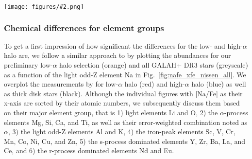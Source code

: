 \documentclass[fleqn,usenatbib]{mnras}
\newcommand{\codeicon}{{\faCloudDownload}}
\newcommand{\codelink}[1]{\href{https://github.com/svenbuder/Accreted-stars-in-GALAH-DR3/tree/main/figures/#1.ipynb}{\codeicon}\,\,}
\newcommand{\oscaption}[2]{\caption{#2 \codelink{#1}}}
\newcommand{\figuretextwidth}[4]{\begin{figure*} \centering \texttt{[image: figures/\#2.png]}\oscaption{#3}{#4}\label{fig:#2} \end{figure*}}
\begin{document}
\figuretextwidth{17cm}{nafe_xfe_nissen_all}{chemical_differences}{
\textbf{Abundances [X/Fe] for the the 28 elements measured by GALAH in addition to Na and Fe, whose abundance ratio [Na/Fe] is used on the ordinate.} The density distribution of the base sample of GALAH+ DR3 (Eq.~\ref{eq:basic_cuts}) is shown in greyscale. GALAH+ DR3 stars which are preliminary tagged to the low-$\alpha$ halo (via Eq.~\ref{eq:prelim_low_alpha_halo}) are shown in orange with numbers indicate in the bottom right.
We also show the data by \citet{Nissen2010} for $\alpha$, Na, Mg, Si, Ca, Ti, Cr, and Ni with red circles for their low-$\alpha$ halo stars, blue open circles for their high-$\alpha$ halo stars and black crossed for their thick disk stars. For the same stars of this study, we plot the data by \citet{Nissen2011} for Mn, Cu, Zn, Y, and Ba, \citet{Nissen2012} for Li (their non-LTE values with arrows for upper limits), \citet{Nissen2014} for O (their non-LTE values based on the $\lambda 7774$ \ion{O}{i} triplet), and \citet{Fishlock2017} for Sc, Zr, La, Ce, Nd, and Eu.} 

\subsubsection{Chemical differences for element groups}

To get a first impression of how significant the differences for the low- and high-$\alpha$ halo are, we follow a similar approach to \citet[][see their Fig.~5]{Nissen2011} by plotting the abundances for our preliminary low-$\alpha$ halo selection (orange) and all GALAH+ DR3 stars (greyscale) as a function of the light odd-Z element Na in Fig.~\ref{fig:nafe_xfe_nissen_all}. We overplot the measurements by \citet{Nissen2010,Nissen2011,Nissen2014,Fishlock2017} for low-$\alpha$ halo (red) and high-$\alpha$ halo (blue) as well as thick disk stars (black). Although the individual figures with [Na/Fe] as their x-axis are sorted by their atomic numbers, we subsequently discuss them based on their major element group, that is 1) light elements Li and O, 2) the $\alpha$-process elements Mg, Si, Ca, and Ti, as well as their error-weighted combination noted as $\alpha$, 3) the light odd-Z elements Al and K, 4) the iron-peak elements Sc, V, Cr, Mn, Co, Ni, Cu, and Zn, 5) the s-process dominated elements Y, Zr, Ba, La, and Ce, and 6) the r-process dominated elements Nd and Eu.
\end{document}
